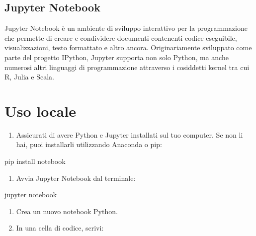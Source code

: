\documentclass[
  letterpaper,
]{scrbook}
\newenvironment{Shaded}{\begin{snugshade}}{\end{snugshade}}
\newcommand{\ExtensionTok}[1]{\textcolor[rgb]{0.00,0.23,0.31}{#1}}
\newcommand{\NormalTok}[1]{\textcolor[rgb]{0.00,0.23,0.31}{#1}}
\providecommand{\tightlist}{%
  \setlength{\itemsep}{0pt}\setlength{\parskip}{0pt}}\usepackage{longtable,booktabs,array}
\begin{document}
\subsection{Jupyter Notebook}\label{jupyter-notebook}

Jupyter Notebook è un ambiente di sviluppo interattivo per la
programmazione che permette di creare e condividere documenti contenenti
codice eseguibile, visualizzazioni, testo formattato e altro ancora.
Originariamente sviluppato come parte del progetto IPython, Jupyter
supporta non solo Python, ma anche numerosi altri linguaggi di
programmazione attraverso i cosiddetti kernel tra cui R, Julia e Scala.

\section{Uso locale}

\begin{enumerate}
\def\labelenumi{\arabic{enumi}.}
\tightlist
\item
  Assicurati di avere Python e Jupyter installati sul tuo computer. Se
  non li hai, puoi installarli utilizzando Anaconda o pip:
\end{enumerate}

\begin{Shaded}
\begin{Highlighting}[]
\ExtensionTok{pip}\NormalTok{ install notebook}
\end{Highlighting}
\end{Shaded}

\begin{enumerate}
\def\labelenumi{\arabic{enumi}.}
\setcounter{enumi}{1}
\tightlist
\item
  Avvia Jupyter Notebook dal terminale:
\end{enumerate}

\begin{Shaded}
\begin{Highlighting}[]
\ExtensionTok{jupyter}\NormalTok{ notebook}
\end{Highlighting}
\end{Shaded}

\begin{enumerate}
\def\labelenumi{\arabic{enumi}.}
\setcounter{enumi}{2}
\item
  Crea un nuovo notebook Python.
\item
  In una cella di codice, scrivi:
\end{enumerate}
\end{document}
